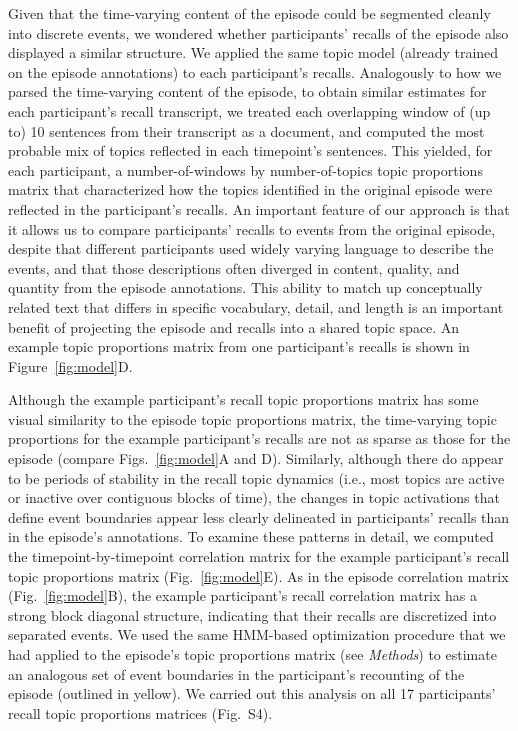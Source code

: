 \documentclass[10pt]{article}
\newcommand{\corrmats}{S4}
\begin{document}
Given that the time-varying content of the episode could be segmented cleanly into discrete events, we wondered whether participants' recalls of the episode also displayed a similar structure.  We applied the same topic model (already trained on the episode annotations) to each participant's recalls.  Analogously to how we parsed the time-varying content of the episode, to obtain similar estimates for each participant's recall transcript, we treated each overlapping  window of (up to) 10 sentences from their transcript as a document, and computed the most probable mix of topics reflected in each timepoint's sentences.  This yielded, for each participant, a number-of-windows by number-of-topics topic proportions matrix that characterized how the topics identified in the original episode were reflected in the participant's recalls.  An important feature of our approach is that it allows us to compare participants' recalls to events from the original episode, despite that different participants used widely varying language to describe the events, and that those descriptions often diverged in content, quality, and quantity from the episode annotations.  This ability to match up conceptually related text that differs in specific vocabulary, detail, and length is an important benefit of projecting the episode and recalls into a shared topic space.  An example topic proportions matrix from one participant's recalls is shown in Figure~\ref{fig:model}D.

Although the example participant's recall topic proportions matrix has some visual similarity to the episode topic proportions matrix, the time-varying topic proportions for the example participant's recalls are not as sparse as those for the episode (compare Figs.~\ref{fig:model}A and D).  Similarly, although there do appear to be periods of stability in the recall topic dynamics (i.e., most topics are active or inactive over contiguous blocks of time), the changes in topic activations that define event boundaries appear less clearly delineated in participants' recalls than in the episode's annotations.  To examine these patterns in detail, we computed the timepoint-by-timepoint correlation matrix for the example participant's recall topic proportions matrix (Fig.~\ref{fig:model}E).  As in the episode correlation matrix (Fig.~\ref{fig:model}B), the example participant's recall correlation matrix has a strong block diagonal structure, indicating that their recalls are discretized into separated events.  We used the same HMM-based optimization procedure that we had applied to the episode's topic proportions matrix (see \textit{Methods}) to estimate an analogous set of event boundaries in the participant's recounting of the episode (outlined in yellow).  We carried out this analysis on all 17 participants' recall topic proportions matrices (Fig.~\corrmats).
\end{document}
